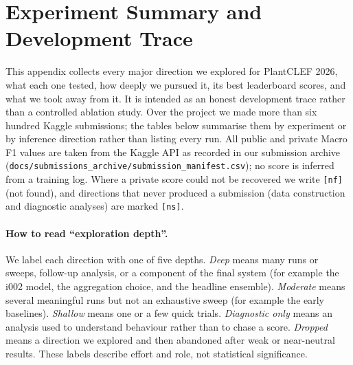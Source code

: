 
\appendix
\section{Experiment Summary and Development Trace}
\label{sec:appendix_experiments}

This appendix collects every major direction we explored for PlantCLEF 2026, what
each one tested, how deeply we pursued it, its best leaderboard scores, and what we
took away from it. It is intended as an honest development trace rather than a
controlled ablation study. Over the project we made more than six hundred Kaggle
submissions; the tables below summarise them by experiment or by inference direction
rather than listing every run. All public and private Macro F1 values are taken from
the Kaggle API as recorded in our submission archive
(\texttt{docs/submissions\_archive/submission\_manifest.csv}); no score is inferred
from a training log. Where a private score could not be recovered we write
\texttt{[nf]} (not found), and directions that never produced a submission (data
construction and diagnostic analyses) are marked \texttt{[ns]}.

\paragraph{How to read ``exploration depth''.}
We label each direction with one of five depths.
\emph{Deep} means many runs or sweeps, follow-up analysis, or a component of the
final system (for example the i002 model, the aggregation choice, and the headline
ensemble). \emph{Moderate} means several meaningful runs but not an exhaustive sweep
(for example the early baselines). \emph{Shallow} means one or a few quick trials.
\emph{Diagnostic only} means an analysis used to understand behaviour rather than to
chase a score. \emph{Dropped} means a direction we explored and then abandoned after
weak or near-neutral results. These labels describe effort and role, not statistical
significance.

